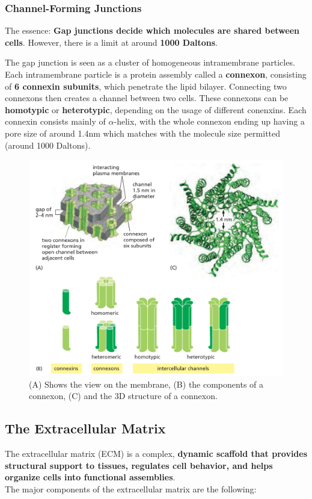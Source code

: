 \documentclass[../main.tex]{subfiles}
\begin{document}
\subsubsection{Channel-Forming Junctions}

The essence: \textbf{Gap junctions decide which molecules are shared between cells}. However, there is a limit at around \textbf{1000 Daltons}.

The gap junction is seen as a cluster of homogeneous intramembrane particles. Each intramembrane particle is a protein assembly called a \textbf{\gls{connexon}}, consisting of \textbf{6 \gls{connexin} subunits}, which penetrate the lipid bilayer. Connecting two connexons then creates a channel between two cells. These connexons can be \textbf{\gls{homotypic}} or \textbf{\gls{heterotypic}}, depending on the usage of different conenxins. Each connexin consists mainly of $\alpha$-helix, with the whole connexon ending up having a pore size of around 1.4nm which matches with the molecule size permitted (around 1000 Daltons).

\begin{figure}[H]
	\centering
	\includegraphics[width=0.8\linewidth]{gap_over}
	\caption{(A) Shows the view on the membrane, (B) the components of a connexon, (C) and the 3D structure of a connexon.}
	\label{fig:gapover}
\end{figure}


\subsection{The Extracellular Matrix}

The extracellular matrix (ECM) is a complex, \textbf{dynamic scaffold that provides structural support to tissues, regulates cell behavior, and helps organize cells into functional assemblies}.\\
The major components of the extracellular matrix are the following:
\end{document}
